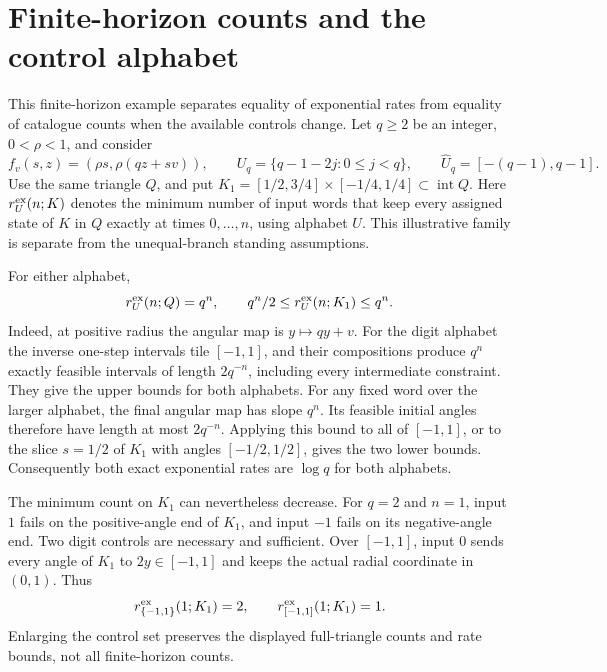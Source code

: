 \documentclass[11pt]{amsart}
\theoremstyle{definition}
\theoremstyle{remark}
\numberwithin{equation}{section}
\begin{document}
\section{Finite-horizon counts and the control alphabet}\label{app:alphabet}
This finite-horizon example separates equality of exponential rates
from equality of catalogue counts when the available controls change.
Let $q\ge2$ be an integer, $0<\rho<1$, and consider
\[
f_v(s,z)=(\rho s,\rho(qz+sv)),\qquad
U_q=\{q-1-2j:0\le j<q\},\qquad
\widehat U_q=[-(q-1),q-1].
\]
Use the same triangle $Q$, and put
$K_1=[1/2,3/4]\times[-1/4,1/4]\subset\operatorname{int}Q$.
Here $r^{\rm ex}_U(n;K)$ denotes the minimum number of input words
that keep every assigned state of $K$ in $Q$ exactly at times
$0,\ldots,n$, using alphabet $U$. This illustrative family is
separate from the unequal-branch standing assumptions.

For either alphabet,
\[
r^{\rm ex}_U(n;Q)=q^n,\qquad
q^n/2\le r^{\rm ex}_U(n;K_1)\le q^n.
\]
Indeed, at positive radius the angular map is $y\mapsto qy+v$.
For the digit alphabet the inverse one-step intervals tile
$[-1,1]$, and their compositions produce $q^n$ exactly feasible
intervals of length $2q^{-n}$, including every intermediate
constraint. They give the upper bounds for both alphabets.
For any fixed word over the larger alphabet, the final angular map
has slope $q^n$. Its feasible initial angles therefore have length
at most $2q^{-n}$. Applying this bound to all of $[-1,1]$, or to
the slice $s=1/2$ of $K_1$ with angles $[-1/2,1/2]$, gives the
two lower bounds. Consequently both exact exponential rates are
$\log q$ for both alphabets.

The minimum count on $K_1$ can nevertheless decrease. For $q=2$
and $n=1$, input $1$ fails on the positive-angle end of $K_1$,
and input $-1$ fails on its negative-angle end. Two digit controls
are necessary and sufficient. Over $[-1,1]$, input $0$ sends
every angle of $K_1$ to $2y\in[-1,1]$ and keeps the actual radial
coordinate in $(0,1)$. Thus
\[
r^{\rm ex}_{\{-1,1\}}(1;K_1)=2,
\qquad r^{\rm ex}_{[-1,1]}(1;K_1)=1.
\]
Enlarging the control set preserves the displayed full-triangle
counts and rate bounds, not all finite-horizon counts.
\end{document}
